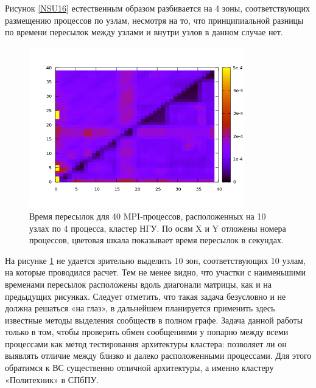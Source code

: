         
        Рисунок \ref{NSU16} естественным образом разбивается на 4 зоны, соответствующих размещению процессов по узлам, несмотря на то, что принципиальной разницы по времени пересылок между узлами и внутри узлов в данном случае нет.
        
        \begin{figure}[htb]
        	\begin{center}
        		\includegraphics[height=7cm,keepaspectratio]{images/RomanenkoAASnytnikovAVChernykhIGadaptationtosupercomputerfinalEXTENDEDREFERENCES-img10.png}
        	\end{center}
        	\caption{ Время пересылок для 40 MPI-процессов, расположенных на 10 узлах по 4 процесса, кластер НГУ. По осям X и Y отложены номера процессов, цветовая шкала показывает время пересылок в секундах.}
        	\label{NSU40}
        \end{figure}
        
       
        На рисунке \ref{NSU40} не удается зрительно выделить 10 зон, соответствующих 10 узлам, на которые проводился расчет. Тем не менее видно, что участки с наименьшими временами пересылок расположены вдоль диагонали матрицы, как и на предыдущих рисунках.
        Следует отметить, что такая задача безусловно и не должна решаться «на глаз», в дальнейшем планируется применить здесь известные методы выделения сообществ в полном графе. Задача данной работы только в том, чтобы проверить обмен сообщениями у попарно между всеми процессами как метод тестирования архитектуры кластера: позволяет ли он выявлять отличие между близко и далеко расположенными процессами. Для этого обратимся к ВС существенно отличной архитектуры, а именно кластеру «Политехник» в СПбПУ.
        
